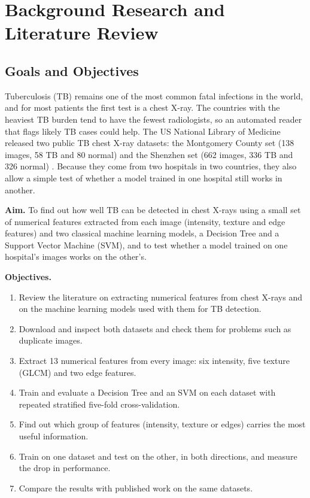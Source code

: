 \documentclass[11pt,a4paper]{article}
\begin{document}
\makecoverpage
\makecontents

\section{Background Research and Literature Review}
\subsection{Goals and Objectives}
Tuberculosis (TB) remains one of the most common fatal infections in the world, and for most patients the first test is a chest X-ray. The countries with the heaviest TB burden tend to have the fewest radiologists, so an automated reader that flags likely TB cases could help. The US National Library of Medicine released two public TB chest X-ray datasets: the Montgomery County set (138 images, 58 TB and 80 normal) and the Shenzhen set (662 images, 336 TB and 326 normal) \citep{jaeger2014}. Because they come from two hospitals in two countries, they also allow a simple test of whether a model trained in one hospital still works in another.

\noindent\textbf{Aim.} To find out how well TB can be detected in chest X-rays using a small set of numerical features extracted from each image (intensity, texture and edge features) and two classical machine learning models, a Decision Tree and a Support Vector Machine (SVM), and to test whether a model trained on one hospital's images works on the other's.

\noindent\textbf{Objectives.}
\begin{enumerate}\itemsep2pt
  \item Review the literature on extracting numerical features from chest X-rays and on the machine learning models used with them for TB detection.
  \item Download and inspect both datasets and check them for problems such as duplicate images.
  \item Extract 13 numerical features from every image: six intensity, five texture (GLCM) and two edge features.
  \item Train and evaluate a Decision Tree and an SVM on each dataset with repeated stratified five-fold cross-validation.
  \item Find out which group of features (intensity, texture or edges) carries the most useful information.
  \item Train on one dataset and test on the other, in both directions, and measure the drop in performance.
  \item Compare the results with published work on the same datasets.
\end{enumerate}
\end{document}
